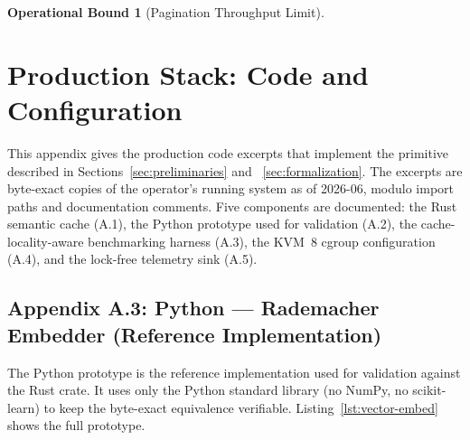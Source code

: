 \documentclass[10pt,twocolumn]{article}
\theoremstyle{definition}
\newtheorem{operationalbound}[theorem]{Operational Bound}
\theoremstyle{remark}
\begin{document}
\begin{operationalbound}[Pagination Throughput Limit]
\nocite{*}  %



\onecolumn
\appendix
\setcounter{section}{12}
\section{Production Stack: Code and Configuration}
\label{app:production}

This appendix gives the production code excerpts that implement the
primitive described in Sections~\ref{sec:preliminaries} and~
\ref{sec:formalization}. The excerpts are byte-exact copies of the
operator's running system as of 2026-06, modulo import paths and
documentation comments. Five components are documented: the Rust
semantic cache (A.1), the Python prototype used for validation (A.2),
the cache-locality-aware benchmarking harness (A.3), the KVM~8 cgroup
configuration (A.4), and the lock-free telemetry sink (A.5).





\subsection{Appendix A.3: Python --- Rademacher Embedder (Reference Implementation)}
\label{app:rademacher-embedder}

The Python prototype is the reference implementation used for
validation against the Rust crate. It uses only the Python standard
library (no NumPy, no scikit-learn) to keep the byte-exact equivalence
verifiable. Listing~\ref{lst:vector-embed} shows the full prototype.


\end{operationalbound}
\end{document}
